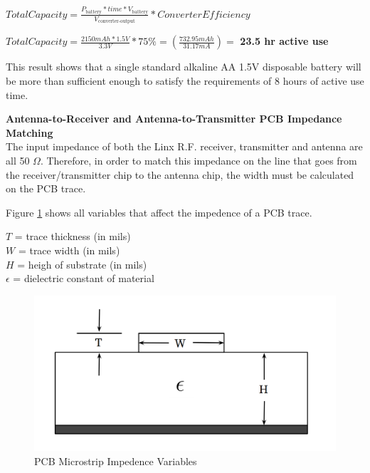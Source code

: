 \documentclass[letterpaper,10pt]{article}
\begin{document}
\begin{spacing}{1.15}
\begin{center} 
$Total Capacity = \frac{P_\textrm{battery}* time *  V_\textrm{battery}} {V_\textrm{converter-output}} * Converter Efficiency$

$ Total Capacity = \frac{2150 mAh *  1.5V} {3.3V} * 75\% = \left(\frac{732.95 mAh}{31.17mA}\right) =$ \textbf{23.5 hr active use} 
\end{center}

This result shows that a single standard alkaline AA 1.5V disposable battery will be more than sufficient enough to satisfy the requirements of 8 hours of active use time.

\normalsize\textbf{Antenna-to-Receiver and Antenna-to-Transmitter PCB Impedance Matching} \\
The input impedance of both the Linx R.F. receiver, transmitter and antenna are all 50 $\Omega$. Therefore, in order to match this impedance on the line that goes from the receiver/transmitter chip to the antenna chip, the width must be calculated on the PCB trace. 

Figure \ref{fig:pcb-trace} shows all variables that affect the impedence of a PCB trace. 

\begin{center}
	$T $ = trace thickness (in mils) \\
	$W$ = trace width  (in mils) \\
	$H$ = heigh of substrate (in mils) \\
	$\epsilon$ = dielectric constant of material
\end{center}

\begin{figure} [H]
	\centering
	\includegraphics[scale=0.3]{PCB_Trace_Figure.png}
	\caption{PCB Microstrip Impedence Variables\label{fig:pcb-trace}}
\end{figure}


\end{spacing}
\end{document}

